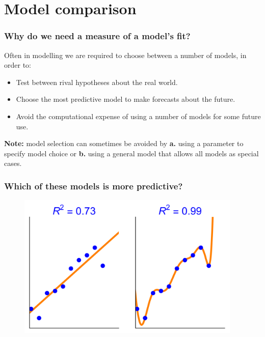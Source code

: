 \documentclass[handout]{beamer}
\begin{document}
\section{Model comparison}
\frame{\tableofcontents[currentsection]}

\begin{frame}
	\frametitle{Why do we need a measure of a model's fit?}
	
	Often in modelling we are required to choose between a number of models, in order to:
	
	\begin{itemize}
		\item<3-> Test between rival hypotheses about the real world.
		\item<4-> Choose the most predictive model to make forecasts about the future.
		\item<5-> Avoid the computational expense of using a number of models for some future use.
	\end{itemize}
	
	 \textbf{Note:} model selection can sometimes be avoided by \textbf{a.} using a parameter to specify model choice or \textbf{b.} using a general model that allows all models as special cases.
	
\end{frame}

\begin{frame}
	\frametitle{Which of these models is more predictive?}
	
	\begin{figure}[ht]
		\centerline{\includegraphics[width=0.95\textwidth]{figures/lec7_modelFitTest.pdf}}
	\end{figure}

\end{frame}
\end{document}
